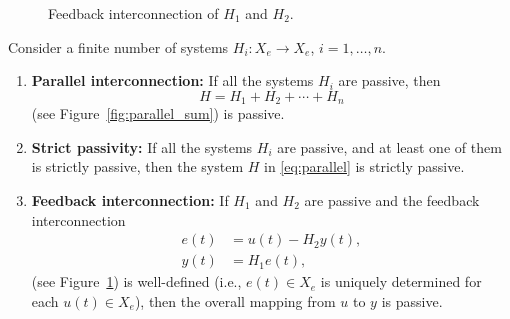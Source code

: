 \begin{figure}[!h]
\centering
{}
\caption{Feedback interconnection of $H_1$ and $H_2$.}
\label{fig:feedback_system}
\end{figure}

\begin{theorem}
Consider a finite number of systems $H_i : X_e \to X_e$, $i = 1, \dots, n$.
\begin{enumerate}
    \item \textbf{Parallel interconnection:}  
    If all the systems $H_i$ are passive, then
    \begin{equation}\label{eq:parallel}
        H = H_1 + H_2 + \cdots + H_n
    \end{equation}
    (see Figure~\ref{fig:parallel_sum}) is passive.
    
    \item \textbf{Strict passivity:}  
    If all the systems $H_i$ are passive, and at least one of them is strictly passive, then
    the system $H$ in \eqref{eq:parallel} is strictly passive.
    
    \item \textbf{Feedback interconnection:}  
    If $H_1$ and $H_2$ are passive and the feedback interconnection
    \begin{align}
        e(t) &= u(t) - H_2 y(t), \label{eq:feedback1}\\
        y(t) &= H_1 e(t), \label{eq:feedback2}
    \end{align}
    (see Figure~\ref{fig:feedback_system}) is well-defined (i.e., $e(t) \in X_e$ is uniquely
    determined for each $u(t) \in X_e$), then the overall mapping from $u$ to $y$ is passive.
\end{enumerate}
\end{theorem}

